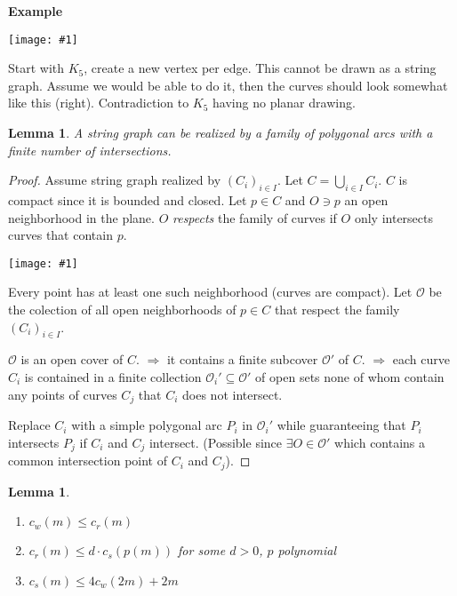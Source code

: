 \documentclass[12pt]{article}
\theoremstyle{plain} %
\newtheorem{lemma}[theorem]{Lemma}
\newcommand{\image}[1]{\begin{center}\texttt{[image: \#1]}\end{center}}
\begin{document}
\textbf{Example}
\image{images/figure-0.png}

Start with \(K_5\), create a new vertex per edge.
This cannot be drawn as a string graph. 
Assume we would be able to do it, then the curves should look 
somewhat like this (right). Contradiction to \(K_5\) having no planar drawing.

\begin{lemma}\label{lem:finite-intersections}
A string graph can be realized by a family of polygonal arcs with a finite number of intersections.
\end{lemma}

\begin{proof}
Assume string graph realized by \( (C_i)_{i\in I} \). Let \(C = \bigcup_{i\in I} C_i\).
\(C\) is compact since it is bounded and closed. Let \(p \in C\) and \(O \ni p\) an open neighborhood 
in the plane. \(O\) \textit{respects} the family of curves if \(O\) only intersects curves that contain \(p\).

\image{images/figure-1.jpeg}

Every point has at least one such neighborhood (curves are compact). 
Let \(\mathcal{O}\) be the colection of all open neighborhoods of \(p\in C\) that respect 
the family \((C_i)_{i\in I}\). 

\(\mathcal{O}\) is an open cover of \(C\). \(\Rightarrow\) it contains a finite subcover 
\(\mathcal{O}'\) of \(C\). \(\Rightarrow\) each curve \(C_i\) is contained 
in a finite collection \(\mathcal{O}_i' \subseteq \mathcal{O}'\) of open sets
none of whom contain any points of curves \(C_j\) that \(C_i\) does not intersect. 

Replace \(C_i\) with a simple polygonal arc \(P_i\) in \(\mathcal{O}_i'\) 
while guaranteeing that \(P_i\) intersects \(P_j\) if \(C_i\) and \(C_j\) intersect.
(Possible since \(\exists O \in \mathcal{O}'\) which contains a common intersection point of \(C_i\) and \(C_j\)).
\end{proof}

\begin{lemma}\ 
\begin{enumerate}
    \item \(c_w(m) \leq c_r(m)\)
    \item \(c_r(m) \leq d \cdot c_s(p(m))\) for some \(d > 0\), \(p\) polynomial
    \item \(c_s(m) \leq 4 c_w(2m) + 2m\)
\end{enumerate}
\end{lemma}
\end{document}
